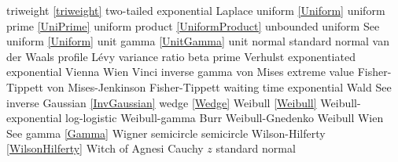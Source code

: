 triweight						\dotfill	\eqref{triweight}						\ncite
two-tailed exponential			\dotfill	Laplace							\ncite %
%
uniform  						\dotfill	\eqref{Uniform}						\ncite 	%
uniform prime					\dotfill	\eqref{UniPrime}					\ncite	%
uniform product 				\dotfill	\eqref{UniformProduct}				\ncite 	%
%
unbounded uniform 				\dotfill	See uniform \eqref{Uniform}			\ncite	%
unit gamma					\dotfill	\eqref{UnitGamma} 					\ncite	%
unit normal					\dotfill	standard normal 					\ncite	%
%
van der Waals profile 			\dotfill	L\'{e}vy 							\ncite	%
variance ratio					\dotfill	beta prime 						\ncite	%
Verhulst						\dotfill	exponentiated exponential					 
Vienna 						\dotfill	Wien 							\ncite	%
Vinci 						\dotfill	inverse gamma 					\ncite	%
von Mises extreme value			\dotfill	Fisher-Tippett 						\ncite	%
von Mises-Jenkinson 			\dotfill	Fisher-Tippett 						\ncite	%
%
waiting time					\dotfill	exponential 						\ncite	%
Wald							\dotfill	See inverse Gaussian	 \eqref{InvGaussian}				\ncite	%
wedge						\dotfill	\eqref{Wedge}  						\ncite	%
Weibull 						\dotfill	\eqref{Weibull} 						\ncite	%
Weibull-exponential 				\dotfill	log-logistic 						\ncite	%
Weibull-gamma					\dotfill	Burr								\ncite	%
Weibull-Gnedenko				\dotfill	Weibull 							\ncite	%
Wien							\dotfill	See gamma \eqref{Gamma}			\ncite	%
Wigner semicircle				\dotfill	semicircle 						\ncite	%
Wilson-Hilferty					\dotfill	\eqref{WilsonHilferty} 				\ncite	%
Witch of Agnesi					\dotfill	Cauchy								%
%	
$z$							\dotfill	standard normal 					\ncite	%



\clearpage

